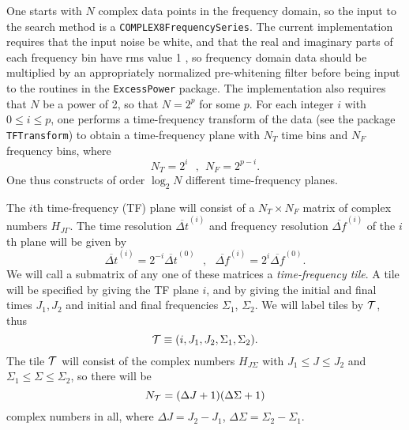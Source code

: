 \documentclass{article}
\begin{document}
One starts with $N$ complex data points in the frequency domain, so the input
to the search method is a \verb+COMPLEX8FrequencySeries+.  
The current implementation requires that the input noise be white, and
that the real and imaginary parts of each frequency bin have rms value 1
, so frequency domain data should be multiplied by an appropriately
normalized pre-whitening filter before being input to the routines in
the \verb+ExcessPower+ package.  
The implementation also requires that $N$ be a power of 2, so that 
$N =2^p$ for some $p$.  For each integer $i$ with $0 \le i \le p$, one
performs a time-frequency transform of the data (see the package
\verb+TFTransform+) to obtain a time-frequency plane with $N_T$ time bins
and $N_F$ frequency bins, where
\begin{equation}
N_T = 2^i \ \ \ , \ \ N_F = 2^{p-i}.
\label{tfplanes}
\end{equation}
One thus constructs of order $\log_2 N$ different time-frequency
planes. 

The $i$th time-frequency (TF) plane will consist of a $N_T \times N_F$
matrix of complex numbers $H_{J\Gamma}$.  The time resolution
${\overline {\Delta t}}^{(i)}$ and frequency resolution ${\overline
{\Delta f}}^{(i)}$ of the $i$th plane will be given by
\begin{equation}
{\overline {\Delta t}}^{(i)} = 2^{-i} {\overline {\Delta t}}^{(0)} \ \
\ , \ \ \ 
{\overline {\Delta f}}^{(i)} = 2^{i} {\overline {\Delta f}}^{(0)}.
\label{resolutions}
\end{equation}
We will call a submatrix
of any one of these matrices a {\it time-frequency tile}.  A tile will
be specified by giving the TF plane $i$,
and by giving the initial and final times $J_1, J_2$ and initial and
final frequencies $\Sigma_1$, $\Sigma_2$.  We will label tiles
by ${\cal T}$, thus 
\begin{equation}
{\cal T} \equiv (i,J_1,J_2,\Sigma_1,\Sigma_2).
\end{equation}
The tile ${\cal T}$ will consist
of the complex numbers $H_{J\Sigma}$ with $J_1 \le J \le J_2$ and
$\Sigma_1 \le \Sigma \le \Sigma_2$, so there will be 
\begin{equation}
N_{\cal T} = (\Delta J+1) (\Delta \Sigma+1)
\end{equation}
complex numbers in all, where $\Delta J = J_2 - J_1$, $\Delta \Sigma =
\Sigma_2 - \Sigma_1$. 
\end{document}
